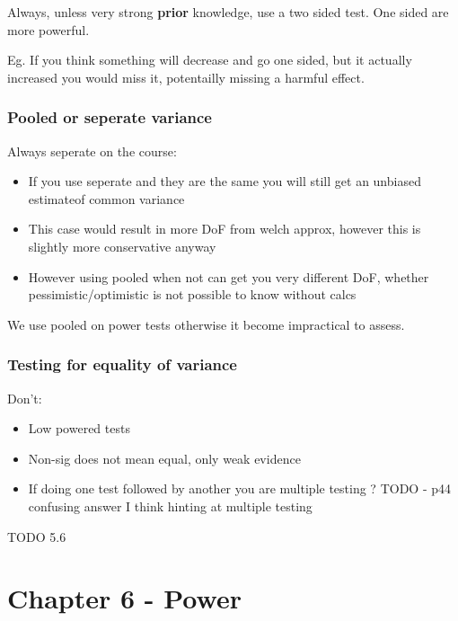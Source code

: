 \documentclass[
  letterpaper,
  DIV=11,
  numbers=noendperiod]{scrreprt}
\providecommand{\tightlist}{%
  \setlength{\itemsep}{0pt}\setlength{\parskip}{0pt}}\usepackage{longtable,booktabs,array}
\begin{document}
Always, unless very strong \textbf{prior} knowledge, use a two sided
test. One sided are more powerful.

Eg. If you think something will decrease and go one sided, but it
actually increased you would miss it, potentailly missing a harmful
effect.

\hypertarget{pooled-or-seperate-variance}{%
\subsection{Pooled or seperate
variance}\label{pooled-or-seperate-variance}}

Always seperate on the course:

\begin{itemize}
\tightlist
\item
  If you use seperate and they are the same you will still get an
  unbiased estimateof common variance
\item
  This case would result in more DoF from welch approx, however this is
  slightly more conservative anyway
\item
  However using pooled when not can get you very different DoF, whether
  pessimistic/optimistic is not possible to know without calcs
\end{itemize}

We use pooled on power tests otherwise it become impractical to assess.

\hypertarget{testing-for-equality-of-variance}{%
\subsection{Testing for equality of
variance}\label{testing-for-equality-of-variance}}

Don't:

\begin{itemize}
\tightlist
\item
  Low powered tests
\item
  Non-sig does not mean equal, only weak evidence
\item
  If doing one test followed by another you are multiple testing ? TODO
  - p44 confusing answer I think hinting at multiple testing
\end{itemize}

TODO 5.6


\hypertarget{chapter-6---power}{%
\chapter{Chapter 6 - Power}\label{chapter-6---power}}
\end{document}
